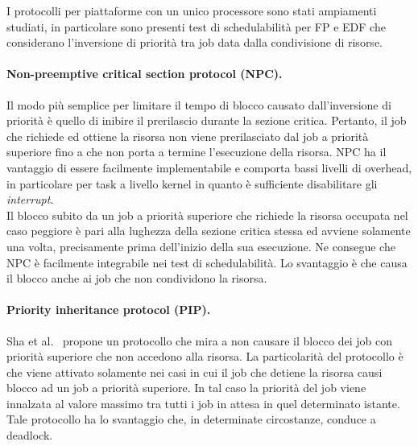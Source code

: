 I protocolli per piattaforme con un unico processore sono stati ampiamenti studiati, in particolare sono presenti test di schedulabilità per FP e EDF che considerano l'inversione di priorità tra job data dalla condivisione di risorse.\\

\paragraph{Non-preemptive critical section protocol (NPC).} Il modo più semplice per limitare il tempo di blocco causato dall'inversione di priorità è quello di inibire il prerilascio durante la sezione critica. Pertanto, il job che richiede ed ottiene la risorsa non viene prerilasciato dal job a priorità superiore fino a che non porta a termine l'esecuzione della risorsa. NPC ha il vantaggio di essere facilmente implementabile e comporta bassi livelli di overhead, in particolare per task a livello kernel in quanto è sufficiente disabilitare gli \textit{interrupt}.\\
Il blocco subito da un job a priorità superiore che richiede la risorsa occupata nel caso peggiore è pari alla lughezza della sezione critica stessa ed avviene solamente una volta, precisamente prima dell'inizio della sua esecuzione. Ne consegue che NPC è facilmente integrabile nei test di schedulabilità. Lo svantaggio è che causa il blocco anche ai job che non condividono la risorsa.\\

\paragraph{Priority inheritance protocol (PIP).} Sha et al.~\cite{Sha:1990:PIP:102822.626613} propone un protocollo che mira a non causare il blocco dei job con priorità superiore che non accedono alla risorsa. La particolarità del protocollo è che viene attivato solamente nei casi in cui il job che detiene la risorsa causi blocco ad un job a priorità superiore. In tal caso la priorità del job viene innalzata al valore massimo tra tutti i job in attesa in quel determinato istante. Tale protocollo ha lo svantaggio che, in determinate circostanze, conduce a deadlock.\\

